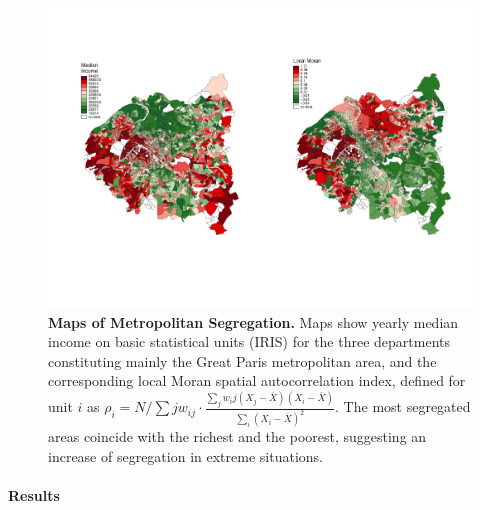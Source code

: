 \documentclass[runningheads,a4paper]{llncs2e/llncs}
\begin{document}
\begin{figure}[h!]
\centering
\hspace{-3cm}\includegraphics[width=1.2\textwidth]{figures/grandParis_income_moran}
\vspace{-2.5cm}
\caption{\textbf{Maps of Metropolitan Segregation.} Maps show yearly median income on basic statistical units (IRIS) for the three departments constituting mainly the Great Paris metropolitan area, and the corresponding local Moran spatial autocorrelation index, defined for unit $i$ as $\rho_i = N/\sum{j}w_{ij} \cdot \frac{\sum_j w_ij (X_j - \bar{X})(X_i - \bar{X})}{\sum_i (X_i - \bar{X})^2}$. The most segregated areas coincide with the richest and the poorest, suggesting an increase of segregation in extreme situations.}
\end{figure}

\paragraph{Results}
\end{document}
